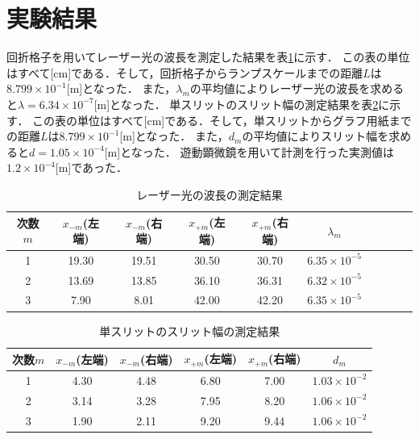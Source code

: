 \documentclass[a4paper,11pt]{ltjsarticle}
\begin{document}
\section{実験結果}
回折格子を用いてレーザー光の波長を測定した結果を表\ref{tab:laser}に示す．
この表の単位はすべて[cm]である．そして，回折格子からランプスケールまでの距離$L$は$8.799 \times 10 ^ {-1}$[m]となった．
また，$\lambda_m$の平均値によりレーザー光の波長を求めると$\lambda = 6.34 \times 10^{-7}$[m]となった．
単スリットのスリット幅の測定結果を表\ref{tab:slit}に示す．
この表の単位はすべて[cm]である．そして，単スリットからグラフ用紙までの距離$L$は$8.799 \times 10 ^ {-1}$[m]となった．
また，$d_m$の平均値によりスリット幅を求めると$d = 1.05 \times 10^{-4}$[m]となった．
遊動顕微鏡を用いて計測を行った実測値は$1.2\times 10^{-4}$[m]であった．
\begin{table}[H]
  \centering
  \caption{レーザー光の波長の測定結果}
  \label{tab:laser}
  \begin{tabular}{|c|c|c|c|c|c|c|c|c|c|}
    \hline
    次数$m$ & $x_{-m}$(左端) & $x_{-m}$(右端) & $x_{+m}$(左端) & $x_{+m}$(右端) & $\lambda_m$           \\
    \hline
    1     & 19.30        & 19.51        & 30.50        & 30.70        & $6.35 \times 10^{-5}$ \\
    \hline
    2     & 13.69        & 13.85        & 36.10        & 36.31        & $6.32 \times 10^{-5}$ \\
    \hline
    3     & 7.90         & 8.01         & 42.00        & 42.20        & $6.35 \times 10^{-5}$ \\
    \hline
  \end{tabular}
\end{table}
\begin{table}[H]
  \centering
  \caption{単スリットのスリット幅の測定結果}
  \label{tab:slit}
  \begin{tabular}{|c|c|c|c|c|c|}
    \hline
    次数$m$ & $x_{-m}$(左端) & $x_{-m}$(右端) & $x_{+m}$(左端) & $x_{+m}$(右端) & $d_m$                 \\
    \hline
    1     & 4.30         & 4.48         & 6.80         & 7.00         & $1.03 \times 10^{-2}$ \\
    \hline
    2     & 3.14         & 3.28         & 7.95         & 8.20         & $1.06 \times 10^{-2}$ \\
    \hline
    3     & 1.90         & 2.11         & 9.20         & 9.44         & $1.06 \times 10^{-2}$ \\
    \hline
  \end{tabular}
\end{table}
\end{document}

